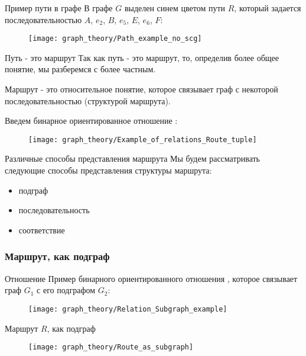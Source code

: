 \begin{frame}{Пример пути в графе}
  В графе $G$ выделен синем цветом пути $R$, который задается
  последовательностью $A$, $e_2$, $B$, $e_5$, $E$, $e_6$, $F$:
  \begin{figure}
    \centering
    \texttt{[image: graph\_theory/Path\_example\_no\_scg]}
  \end{figure}
\end{frame}

\begin{frame}{Путь - это маршрут}
  Так как путь - это маршрут, то, определив более общее понятие, мы
  разберемся с более частным.

  Маршрут - это относительное понятие, которое связывает граф с
  некоторой последовательностью (структурой маршрута).

  Введем бинарное ориентированное отношение :
  \begin{figure}
    \centering
    \texttt{[image: graph\_theory/Example\_of\_relations\_Route\_tuple]}
  \end{figure}
\end{frame}

\begin{frame}{Различные способы представления маршрута}
  Мы будем рассматривать следующие способы представления структуры
  маршрута:
  \begin{itemize}
  \item подграф
  \item последовательность
  \item соответствие
  \end{itemize}
\end{frame}

\subsubsection{Маршрут, как подграф}

\begin{frame}{Отношение }
  Пример бинарного ориентированного отношения ,
  которое связывает граф $G_1$ с его подграфом $G_2$:
  \begin{figure}
    \centering
    \texttt{[image: graph\_theory/Relation\_Subgraph\_example]}
  \end{figure}
\end{frame}

\begin{frame}{Маршрут $R$, как подграф}
  \begin{figure}
    \centering
    \texttt{[image: graph\_theory/Route\_as\_subgraph]}
  \end{figure}
\end{frame}

